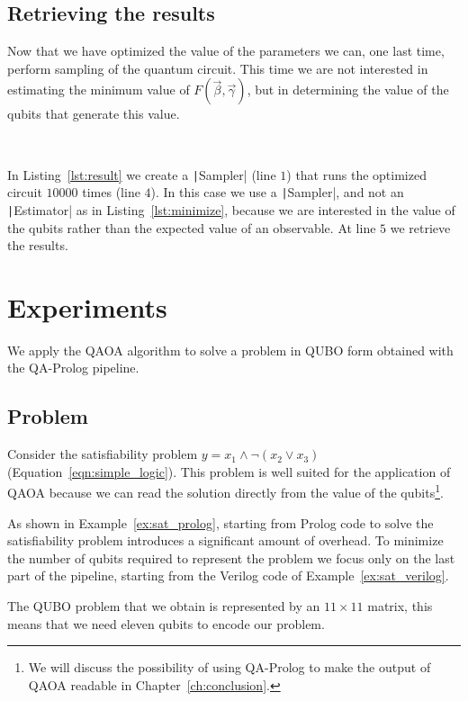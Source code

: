 \subsection{Retrieving the results}
Now that we have optimized the value of the parameters we can, one last time, perform sampling of the quantum circuit. This time we are not interested in estimating the minimum value of $F(\vec{\beta}, \vec{\gamma})$, but in determining the value of the qubits that generate this value.

\begin{listingenv}[h]
	\caption{Circuit sampling}
	\label{lst:result}
\end{listingenv}\

In Listing~\ref{lst:result} we create a \texttt|Sampler| (line $1$) that runs the optimized circuit $10000$ times (line $4$). In this case we use a \texttt|Sampler|, and not an \texttt|Estimator| as in Listing~\ref{lst:minimize}, because we are interested in the value of the qubits rather than the expected value of an observable. At line $5$ we retrieve the results.

\section{Experiments}
We apply the QAOA algorithm to solve a problem in QUBO form obtained with the QA-Prolog pipeline.
\subsection{Problem}
Consider the satisfiability problem $y = x_1 \land\neg(x_2 \lor x_3)$ (Equation~\ref{eqn:simple_logic}). This problem is well suited for the application of QAOA because we can read the solution directly from the value of the qubits\footnote{We will discuss the possibility of using QA-Prolog to make the output of QAOA readable in Chapter~\ref{ch:conclusion}.}. 

As shown in Example~\ref{ex:sat_prolog}, starting from Prolog code to solve the satisfiability problem introduces a significant amount of overhead. To minimize the number of qubits required to represent the problem we focus only on the last part of the pipeline, starting from the Verilog code of Example~\ref{ex:sat_verilog}.

The QUBO problem that we obtain is represented by an $11\times11$ matrix, this means that we need eleven qubits to encode our problem.

